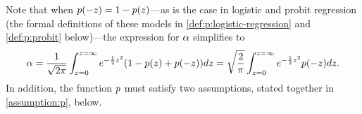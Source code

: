 Note that when \(  p(-z) = 1-p(z)  \)---as is the case in logistic and probit regression (\see the formal definitions of these models in \DEFINITIONS \ref{def:p:logistic-regression} and \ref{def:p:probit} below)---the expression for \(  \alpha  \) simplifies to
\begin{gather*}
  \alphaX
  =
  \frac{1}{\sqrt{2\pi}}
  \int_{\zX=0}^{\zX=\infty}
  e^{-\frac{1}{2} \zX^{2}}
  (\pExpr{\zX})
  d\zX
  =
  \sqrt{\frac{2}{\pi}}
  \int_{\zX=0}^{\zX=\infty}
  e^{-\frac{1}{2} \zX^{2}}
  \pFn( -\zX )
  d\zX
.\end{gather*}
%
In addition, the function \(  p  \) must satisfy two assumptions, stated together in \ASSUMPTION \ref{assumption:p}, below.
